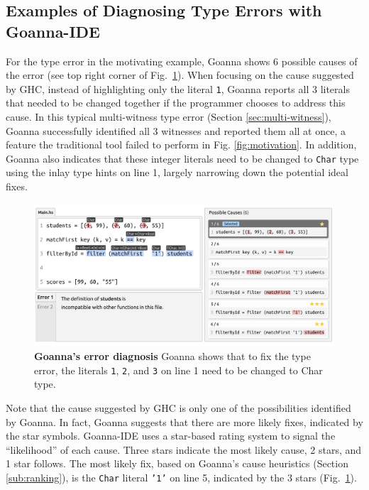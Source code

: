 \documentclass[pdflatex,lineno,sn-nature,Numbered]{sn-jnl}%
\begin{document}
    \subsection{Examples of Diagnosing Type Errors with Goanna-IDE}

    For the type error in the motivating example, Goanna shows 6 possible causes of the error (see top right corner of Fig.~\ref{fig:goanna-example-1}). When focusing on the cause suggested by GHC, instead of highlighting only the literal \texttt{1}, Goanna reports all 3 literals that needed to be changed together if the programmer chooses to address this cause. In this typical multi-witness type error (Section \ref{sec:multi-witness}), Goanna successfully identified all 3 witnesses and reported them all at once, a feature the traditional tool failed to perform in Fig. \ref{fig:motivation}.  In addition, Goanna also indicates that these integer literals need to be changed to \texttt{Char} type using the inlay type hints on line 1, largely narrowing down the potential ideal fixes. 

    \begin{figure}[ht!]
        \centering
        \includegraphics[width=\linewidth]{images/Goanna-Example-1.pdf}
        \caption[Goanna's showing possible causes of a type error (1)]{\textbf{Goanna's error diagnosis} Goanna shows that to fix the type error, the literals \texttt{1}, \texttt{2}, and \texttt{3} on line 1 need to be changed to Char type.}
        \label{fig:goanna-example-1}
    \end{figure}

    Note that the cause suggested by GHC is only one of the possibilities identified by Goanna. In fact, Goanna suggests that there are more likely fixes, indicated by the star symbols. Goanna-IDE uses a star-based rating system to signal the ``likelihood'' of each cause. Three stars indicate the most likely cause, 2 stars, and 1 star follows.  The most likely fix, based on Goanna's cause heuristics (Section \ref{sub:ranking}), is the \texttt{Char} literal \texttt{'1'} on line 5, indicated by the 3 stars (Fig.~\ref{fig:goanna-example-1}).
    
\end{document}
